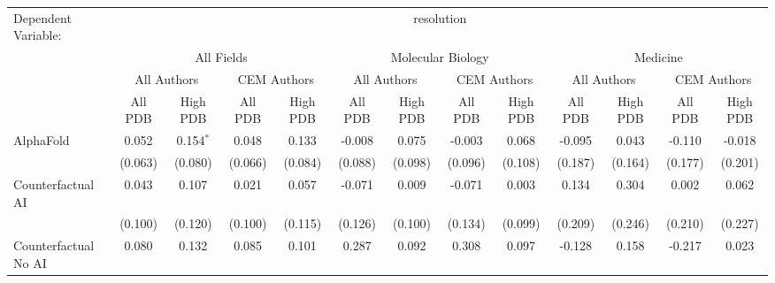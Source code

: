 \begingroup
\centering
\begin{tabular}{lcccccccccccc}
   \tabularnewline \midrule \midrule
   Dependent Variable: & \multicolumn{12}{c}{resolution}\\
 & \multicolumn{4}{c}{All Fields} & \multicolumn{4}{c}{Molecular Biology} & \multicolumn{4}{c}{Medicine} \\
\cmidrule(lr){2-5} \cmidrule(lr){6-9} \cmidrule(lr){10-13}
 & \multicolumn{2}{c}{All Authors} & \multicolumn{2}{c}{CEM Authors} & \multicolumn{2}{c}{All Authors} & \multicolumn{2}{c}{CEM Authors} & \multicolumn{2}{c}{All Authors} & \multicolumn{2}{c}{CEM Authors} \\
\cmidrule(lr){2-3} \cmidrule(lr){4-5} \cmidrule(lr){6-7} \cmidrule(lr){8-9} \cmidrule(lr){10-11} \cmidrule(lr){12-13}
 & \multicolumn{1}{c}{All PDB} & \multicolumn{1}{c}{High PDB} & \multicolumn{1}{c}{All PDB} & \multicolumn{1}{c}{High PDB} & \multicolumn{1}{c}{All PDB} & \multicolumn{1}{c}{High PDB} & \multicolumn{1}{c}{All PDB} & \multicolumn{1}{c}{High PDB} & \multicolumn{1}{c}{All PDB} & \multicolumn{1}{c}{High PDB} & \multicolumn{1}{c}{All PDB} & \multicolumn{1}{c}{High PDB} \\
\cmidrule(lr){2-2} \cmidrule(lr){3-3} \cmidrule(lr){4-4} \cmidrule(lr){5-5} \cmidrule(lr){6-6} \cmidrule(lr){7-7} \cmidrule(lr){8-8} \cmidrule(lr){9-9} \cmidrule(lr){10-10} \cmidrule(lr){11-11} \cmidrule(lr){12-12} \cmidrule(lr){13-13}
   AlphaFold                                                  & 0.052       & 0.154$^{*}$  & 0.048       & 0.133        & -0.008        & 0.075         & -0.003        & 0.068         & -0.095  & 0.043   & -0.110  & -0.018\\   
                                                              & (0.063)     & (0.080)      & (0.066)     & (0.084)      & (0.088)       & (0.098)       & (0.096)       & (0.108)       & (0.187) & (0.164) & (0.177) & (0.201)\\   
   Counterfactual AI                                          & 0.043       & 0.107        & 0.021       & 0.057        & -0.071        & 0.009         & -0.071        & 0.003         & 0.134   & 0.304   & 0.002   & 0.062\\   
                                                              & (0.100)     & (0.120)      & (0.100)     & (0.115)      & (0.126)       & (0.100)       & (0.134)       & (0.099)       & (0.209) & (0.246) & (0.210) & (0.227)\\   
   Counterfactual No AI                                       & 0.080       & 0.132        & 0.085       & 0.101        & 0.287         & 0.092         & 0.308         & 0.097         & -0.128  & 0.158   & -0.217  & 0.023\\   

\end{tabular}
